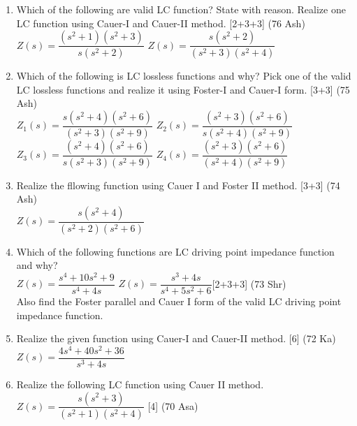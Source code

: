 \documentclass[12pt]{article}
\begin{document}
\begin{enumerate}
				\item Which of the following are valid LC function? State with reason. Realize one LC function using Cauer-I and Cauer-II method. \hfill [2+3+3] (76 Ash)\\
				$Z(s) = \dfrac{(s^2+1)(s^2+3)}{s(s^2+2)}$ \hspace{2cm}
				$Z(s) = \dfrac{s(s^2+2)}{(s^2+3)(s^2+4)}$
				
				\item Which of the following is LC lossless functions and why? Pick one of the valid LC lossless functions and realize it using Foster-I and Cauer-I form. \hfill [3+3] (75 Ash)\\
				$Z_1(s) = \dfrac{s(s^2+4)(s^2+6)}{(s^2+3)(s^2+9)}$ \hspace{2cm}
				$Z_2(s) = \dfrac{(s^2+3)(s^2+6)}{s(s^2+4)(s^2+9)}$ \\
				$Z_3(s) = \dfrac{(s^2+4)(s^2+6)}{s(s^2+3)(s^2+9)}$ \hspace{2cm}
				$Z_4(s) = \dfrac{(s^2+3)(s^2+6)}{(s^2+4)(s^2+9)}$
				
				\item Realize the fllowing function using Cauer I and Foster II method. \hfill [3+3] (74 Ash)\\
				$Z(s) = \dfrac{s(s^2+4)}{(s^2+2)(s^2+6)}$
				
				\item Which of the following functions are LC driving point impedance function and why?\\
				$Z(s) = \dfrac{s^4+10s^2+9}{s^4+4s}$ \hspace{2cm}
				$Z(s) = \dfrac{s^3+4s}{s^4+5s^2+6}$\hfill [2+3+3] (73 Shr)\\
				Also find the Foster parallel and Cauer I form of the valid LC driving point impedance function.
				
				\item Realize the given function using Cauer-I and Cauer-II method. \hfill [6] (72 Ka)\\
				$Z(s) = \dfrac{4s^4+40s^2+36}{s^3+4s}$
				
				\item Realize the following LC function using Cauer II method. $Z(s) = \dfrac{s(s^2+3)}{(s^2+1)(s^2+4)}$ \hfill [4] (70 Asa)
			\end{enumerate}
\end{document}
